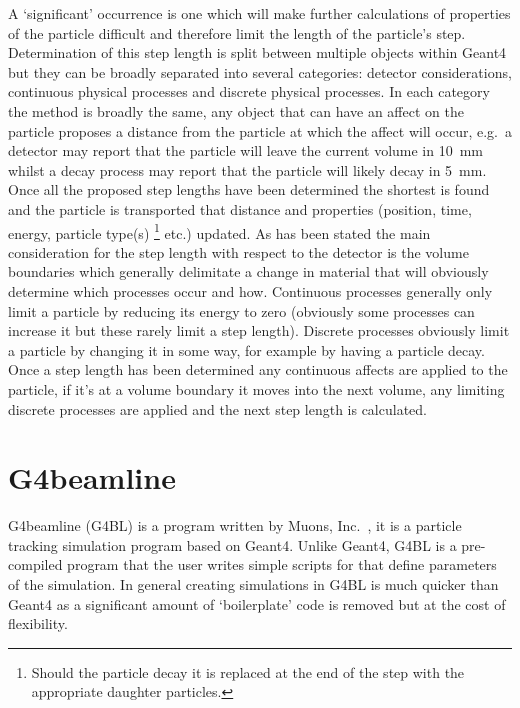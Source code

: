 A `significant' occurrence is one which will make further calculations of properties of the particle difficult and therefore limit the length of the particle's step. Determination of this step length is split between multiple objects within Geant4 but they can be broadly separated into several categories: detector considerations, continuous physical processes and discrete physical processes. In each category the method is broadly the same, any object that can have an affect on the particle proposes a distance from the particle at which the affect will occur, e.g.\ a detector may report that the particle will leave the current volume in 10~mm whilst a decay process may report that the particle will likely decay in 5~mm. Once all the proposed step lengths have been determined the shortest is found and the particle is transported that distance and properties (position, time, energy, particle type(s)
  \footnote{Should the particle decay it is replaced at the end of the step with the appropriate daughter particles.} etc.)
updated. As has been stated the main consideration for the step length with respect to the detector is the volume boundaries which generally delimitate a change in material that will obviously determine which processes occur and how. Continuous processes generally only limit a particle by reducing its energy to zero (obviously some processes can increase it but these rarely limit a step length). Discrete processes obviously limit a particle by changing it in some way, for example by having a particle decay. Once a step length has been determined any continuous affects are applied to the particle, if it's at a volume boundary it moves into the next volume, any limiting discrete processes are applied and the next step length is calculated. 


\section{G4beamline} %
\label{sec:g4beamline}
G4beamline (G4BL) is a program written by Muons, Inc.~\cite{G4BL ref}, it is a particle tracking simulation program based on Geant4. Unlike Geant4, G4BL is a pre-compiled program that the user writes simple scripts for that define parameters of the simulation. In general creating simulations in G4BL is much quicker than Geant4 as a significant amount of `boilerplate' code is removed but at the cost of flexibility.


